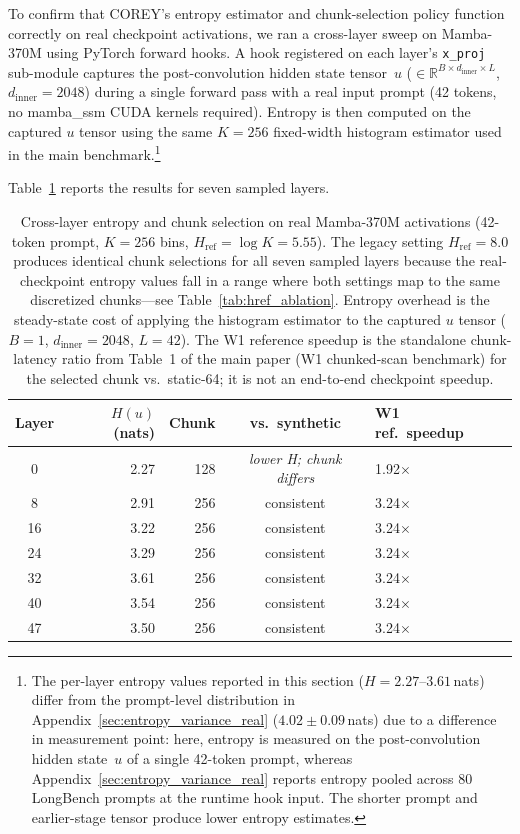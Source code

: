 To confirm that COREY's entropy estimator and chunk-selection policy function correctly on real checkpoint activations, we ran a cross-layer sweep on Mamba-370M using PyTorch forward hooks.
A hook registered on each layer's \texttt{x\_proj} sub-module captures the post-convolution hidden state tensor~$u$ ($\in\mathbb{R}^{B\times d_{\text{inner}}\times L}$, $d_{\text{inner}}{=}2048$) during a single forward pass with a real input prompt (42 tokens, no mamba\_ssm CUDA kernels required).
Entropy is then computed on the captured $u$ tensor using the same $K{=}256$ fixed-width histogram estimator used in the main benchmark.\footnote{The per-layer entropy values reported in this section ($H{=}2.27$--$3.61$\,nats) differ from the prompt-level distribution in Appendix~\ref{sec:entropy_variance_real} ($4.02\pm0.09$\,nats) due to a difference in measurement point: here, entropy is measured on the post-convolution hidden state~$u$ of a single 42-token prompt, whereas Appendix~\ref{sec:entropy_variance_real} reports entropy pooled across 80 LongBench prompts at the runtime hook input. The shorter prompt and earlier-stage tensor produce lower entropy estimates.}

Table~\ref{tab:real_checkpoint_entropy} reports the results for seven sampled layers.

\begin{table}[!t]
\centering
\caption{Cross-layer entropy and chunk selection on real Mamba-370M activations
  (42-token prompt, $K{=}256$ bins, $H_{\text{ref}}{=}\log K{=}5.55$).
  The legacy setting $H_{\text{ref}}{=}8.0$ produces identical chunk selections for all seven sampled layers because the real-checkpoint entropy values fall in a range where both settings map to the same discretized chunks---see Table~\ref{tab:href_ablation}.
  Entropy overhead is the steady-state cost of applying the histogram estimator
  to the captured $u$ tensor ($B{=}1$, $d_{\text{inner}}{=}2048$, $L{=}42$).
  The W1 reference speedup is the standalone chunk-latency ratio from
  Table~1 of the main paper (W1 chunked-scan benchmark) for the selected chunk vs.\ static-64; it is not an end-to-end checkpoint speedup.}
\label{tab:real_checkpoint_entropy}
\small
\begin{tabular}{crrclr}
\toprule
Layer & $H(u)$ (nats) & Chunk & vs.\ synthetic & W1 ref.\ speedup \\
\midrule
 0 & 2.27 & 128 & \emph{lower H; chunk differs} & 1.92$\times$ \\
 8 & 2.91 & 256 & consistent & 3.24$\times$ \\
16 & 3.22 & 256 & consistent & 3.24$\times$ \\
24 & 3.29 & 256 & consistent & 3.24$\times$ \\
32 & 3.61 & 256 & consistent & 3.24$\times$ \\
40 & 3.54 & 256 & consistent & 3.24$\times$ \\
47 & 3.50 & 256 & consistent & 3.24$\times$ \\
\bottomrule
\end{tabular}
\end{table}

